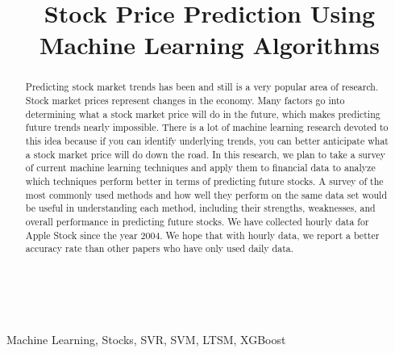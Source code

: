 \usepackage{fancyhdr}\documentclass[conference]{IEEEtran}
\begin{document}
\title{\huge Stock Price Prediction Using Machine Learning Algorithms}

\author{
\and
{}
\and
{}
\and
{}
}

\maketitle

\begin{abstract}
Predicting stock market trends has been and still is a very popular area of research. Stock market prices
represent changes in the economy. Many factors go into determining what a stock market price will do in the
future, which makes predicting future trends nearly impossible. There is a lot of machine learning research
devoted to this idea because if you can identify underlying trends, you can better anticipate
what a stock market price will do down the road. In this research, we plan to take a survey of current machine
learning techniques and apply them to financial data to analyze which techniques perform better in terms
of predicting future stocks. A survey of the most commonly used methods and how well they perform on
the same data set would be useful in understanding each method, including their strengths, weaknesses, and
overall performance in predicting future stocks. We have collected hourly data for Apple Stock since the year 2004. We hope that with hourly data, we report a better accuracy rate than other papers who have only used daily data. 
\end{abstract}

\begin{IEEEkeywords}
\\ 
\\
Machine Learning, Stocks, SVR, SVM, LTSM, XGBoost
\end{IEEEkeywords}
\end{document}
